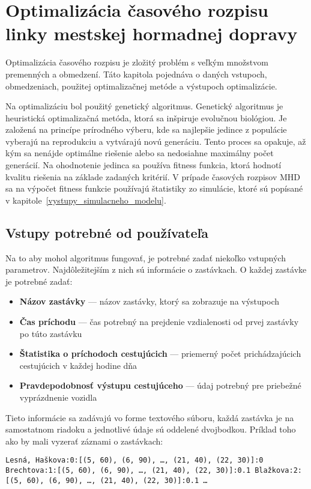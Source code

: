 \chapter{Optimalizácia časového rozpisu linky mestskej hormadnej dopravy}\label{optimalizacia}

Optimalizácia časového rozpisu je zložitý problém s veľkým množstvom premenných a obmedzení.
Táto kapitola pojednáva o daných vstupoch, obmedzeniach, použitej optimalizačnej metóde a výstupoch optimalizácie.

Na optimalizáciu bol použitý genetický algoritmus.
Genetický algoritmus je heuristická optimalizačná metóda, ktorá sa inšpiruje evolučnou biológiou.
Je založená na princípe prírodného výberu, kde sa najlepšie jedince z populácie vyberajú na reprodukciu a vytvárajú novú generáciu.
Tento proces sa opakuje, až kým sa nenájde optimálne riešenie alebo sa nedosiahne maximálny počet generácií.
Na ohodnotenie jedinca sa používa fitness funkcia, ktorá hodnotí kvalitu riešenia na základe zadaných kritérií.
V prípade časových rozpisov MHD sa na výpočet fitness funkcie používajú štatistiky zo simulácie, ktoré sú popísané v kapitole~\ref{vystupy_simulacneho_modelu}.

\section{Vstupy potrebné od používateľa}\label{vstupy_pouzivatela}
Na to aby mohol algoritmus fungovať, je potrebné zadať niekoľko vstupných parametrov.
Najdôležitejším z nich sú informácie o zastávkach. O každej zastávke je potrebné zadať:
\begin{itemize}
  \item \textbf{Názov zastávky} --- názov zastávky, ktorý sa zobrazuje na výstupoch
  \item \textbf{Čas príchodu} --- čas potrebný na prejdenie vzdialenosti od prvej zastávky po túto zastávku
  \item \textbf{Štatistika o príchodoch cestujúcich} --- priemerný počet prichádzajúcich cestujúcich v každej hodine dňa
  \item \textbf{Pravdepodobnosť výstupu cestujúceho} --- údaj potrebný pre priebežné vyprázdnenie vozidla
\end{itemize}
Tieto informácie sa zadávajú vo forme textového súboru, každá zastávka je na samostatnom riadoku a jednotlivé údaje sú oddelené dvojbodkou.
Príklad toho ako by mali vyzerať záznami o zastávkach:

\noindent \texttt{Lesná, Haškova:0:[(5, 60), (6, 90), \ldots , (21, 40), (22, 30)]:0 \newline
  Brechtova:1:[(5, 60), (6, 90), \ldots , (21, 40), (22, 30)]:0.1 \newline
  Blažkova:2:[(5, 60), (6, 90), \ldots , (21, 40), (22, 30)]:0.1 \newline
  \ldots
}

